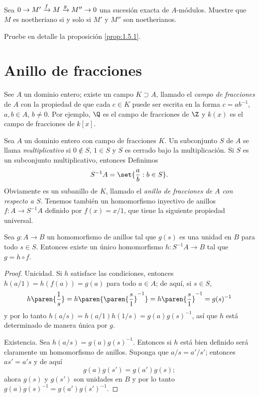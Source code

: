 \ExerciseSection

\begin{exerciseList}
  \item Sea $0 \to M' \xrightarrow{f} M \xrightarrow{g} M'' \to 0$ una sucesión exacta de $A$-módulos. Muestre que $M$ es noetheriano si y solo si $M'$ y $M''$ son noetherianos.
  \item Pruebe en detalle la proposición \ref{prop:1.5.1}.
\end{exerciseList}




\section{Anillo de fracciones}

See $A$ un dominio entero; existe un campo $K \supset A$, llamado el \emph{campo de fracciones} de $A$ con la propiedad de que cada $c \in K$ puede ser escrita en la forma $c = ab^{-1}$, $a, b \in A$, $b \neq 0$. Por ejemplo, $\Q$ es el campo de fracciones de $\Z$ y $k(x)$ es el campo de fracciones de $k[x]$.

Sea $A$ un dominio entero con campo de fracciones $K$. Un subconjunto $S$ de $A$ se llama \emph{multiplicativo} si $0 \notin S$, $1 \in S$ y $S$ es cerrado bajo la multiplicación. Si $S$ es un subconjunto multiplicativo, entonces Definimos
\[
  S^{-1}A = \set{\frac{a}{b} : b \in S}.
\]
Obviamente es un subanillo de $K$, llamado el \emph{anillo de fracciones de $A$ con respecto a $S$}. Tenemos también un homomorfismo inyectivo de anillos $f\colon A \to S^{-1}A$ definido por $f(x) = x/1$, que tiene la siguiente propiedad universal.

\begin{proposition}
  Sea $g\colon A \to B$ un homomorfismo de anillos tal que $g(s)$ es una unidad en $B$ para todo $s \in S$. Entonces existe un único homomorfismo $h\colon S^{-1}A \to B$ tal que $g = h \circ f$.
\end{proposition}
\begin{proof}
  Unicidad. Si $h$ satisface las condiciones, entonces $h(a/1) = h(f(a)) = g(a)$ para todo $a \in A$; de aquí, si $s \in S$, 
  \[
    h\paren{\frac{1}{s}} = h\paren{\paren{\frac{s}{1}}^{-1}} =  h\paren{\frac{s}{1}}^{-1} = g(s)^{-1}
  \]
  y por lo tanto $h(a/s) = h(a/1) h(1/s) = g(a)g(s)^{-1}$, así que $h$ está determinado de manera única por $g$.

  Existencia. Sea $h(a/s) = g(a)g(s)^{-1}$. Entonces si $h$ está bien definido será claramente un homomorfismo de anillos. Suponga que $a/s = a'/s'$; entonces $as' = a's$ y de aquí
  \[
    g(a)g(s') = g(a')g(s);
  \]
  ahora $g(s)$ y $g(s')$ son unidades en $B$ y por lo tanto $g(a)g(s)^{-1} = g(a')g(s')^{-1}$.
\end{proof}

